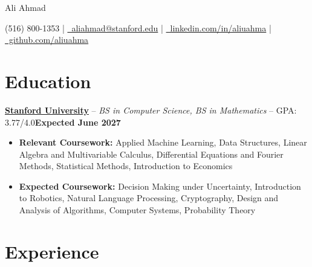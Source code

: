 \documentclass[11pt]{article}       %
\begin{document}
\centerline{\Huge Ali Ahmad}

\vspace{5pt}


\centerline{\faPhone (516) 800-1353 | \href{mailto:aliahmad@stanford.edu}{\faEnvelope\  aliahmad@stanford.edu} | \href{https://linkedin.com/in/aliuahma}{\faLinkedin\ linkedin.com/in/aliuahma} | \href{https://github.com/aliuahma}{\faGithub\  github.com/aliuahma}}

\vspace{-10pt}


\section*{Education}

\textbf{\href{https://www.stanford.edu/}{Stanford University}} -- \emph{BS in Computer Science, BS in Mathematics} -- GPA: 3.77/4.0\hfill \textbf{Expected June 2027} \\
\vspace{-9pt}
\begin{itemize}
  \item \textbf{Relevant Coursework:} Applied Machine Learning, Data Structures, Linear Algebra and Multivariable Calculus, Differential Equations and Fourier Methods, Statistical Methods, Introduction to Economics
  \item \textbf{Expected Coursework:} Decision Making under Uncertainty, Introduction to Robotics, Natural Language Processing, Cryptography, Design and Analysis of Algorithms, Computer Systems, Probability Theory
\end{itemize}


\vspace{-18.5pt}


\section*{Experience}
\end{document}
